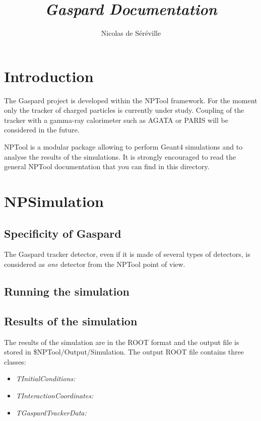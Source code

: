 \documentclass[a4paper,12pt]{article}
\begin{document}
\title{\emph{Gaspard Documentation}}
\author{Nicolas de S\'er\'eville}

\maketitle 
\pagebreak
\tableofcontents %
\pagebreak


\section{Introduction}
The Gaspard project is developed within the NPTool framework. For the 
moment only the tracker of charged particles is currently under study.
Coupling of the tracker with a gamma-ray calorimeter such as AGATA or
PARIS will be considered in the future. 

NPTool is a modular package allowing to perform Geant4 simulations and to 
analyse the results of the simulations. It is strongly encouraged to read 
the general NPTool documentation that you can find in this directory.


\section{NPSimulation}
\subsection{Specificity of Gaspard}
The Gaspard tracker detector, even if it is made of several types of detectors, 
is considered as {\it one} detector from the NPTool point of view.

\subsection{Running the simulation}
\subsection{Results of the simulation}
The results of the simulation are in the ROOT format and the output file 
is stored in \$NPTool/Output/Simulation. The output ROOT file contains
three classes:
\begin{itemize}
   \item {\it TInitialConditions:}
   \item {\it TInteractionCoordinates:}
   \item {\it TGaspardTrackerData:}
\end{itemize}
\end{document}
